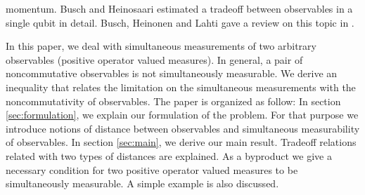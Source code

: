 \documentclass[12pt,showpacs,preprintnumbers,amsmath,amssymb]{revtex4-2}
\begin{document}
 momentum. Busch and Heinosaari \cite{Heinosaari} estimated a tradeoff
 between observables in a single qubit in detail. 
 Busch, Heinonen and Lahti gave a review on this topic in \cite{BHL}.
  \par
  In this paper, we deal with simultaneous measurements 
  of two arbitrary observables (positive operator valued measures). 
 In general, a pair of noncommutative observables 
 is not simultaneously measurable. 
 We derive an inequality that relates the limitation on 
 the simultaneous measurements with the noncommutativity
 of observables. 
 The paper is organized as follow:
 In section \ref{sec:formulation}, we 
 explain our formulation of the problem. 
 For that purpose we  introduce
  notions of distance between 
 observables and simultaneous measurability of 
 observables. 
 In section \ref{sec:main}, we derive our main 
 result. Tradeoff relations related with 
 two types of distances are explained. 
 As a byproduct we give a necessary condition for 
 two positive operator valued measures to be 
 simultaneously measurable. 
 A simple example is also discussed. 
\end{document}
